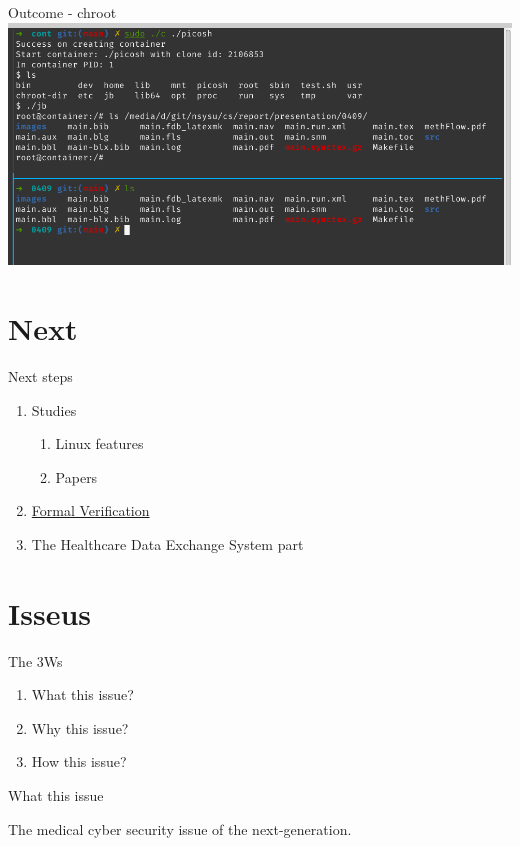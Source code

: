 \documentclass{beamer}
\begin{document}
\begin{frame}{Outcome - chroot}
    \centering\includegraphics[width=\textwidth]{chroot.png}
\end{frame}

\section{Next}
\begin{frame}{Next steps}
    \begin{enumerate}
        \item Studies
              \begin{enumerate}
                  \item Linux features
                  \item Papers
              \end{enumerate}
        \item \href{https://hackmd.io/@sysprog/formal-verification}{Formal Verification}
        \item The Healthcare Data Exchange System part
    \end{enumerate}
\end{frame}

\section{Isseus}
\begin{frame}{The 3Ws}
    \begin{enumerate}
        \item What this issue?
        \item Why this issue?
        \item How this issue?
    \end{enumerate}
\end{frame}

\begin{frame}{What this issue}
    \begin{center}
        \Huge{The medical cyber security issue of the next-generation.}
    \end{center}
\end{frame}
\end{document}
